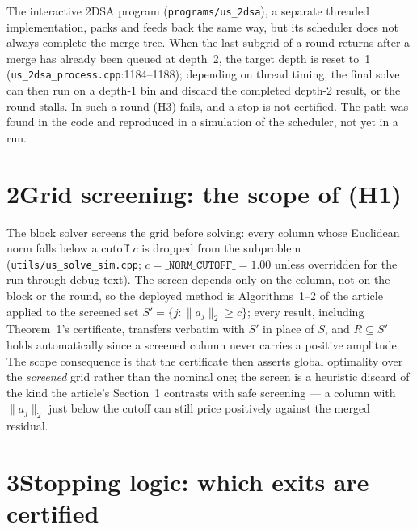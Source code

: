 \documentclass[pdflatex,sn-mathphys-num]{sn-jnl}
\begin{document}
The interactive 2DSA program (\texttt{programs/us\_2dsa}), a separate
threaded implementation, packs and feeds back the same way, but its
scheduler does not always complete the merge tree. When the last
subgrid of a round returns after a merge has already been queued at
depth~2, the target depth is reset to~1
(\texttt{us\_2dsa\_process.cpp}:1184--1188); depending on thread
timing, the final solve can then run on a depth-1 bin and discard the
completed depth-2 result, or the round stalls. In such a round (H3)
fails, and a stop is not certified. The path was found in the code
and reproduced in a simulation of the scheduler, not yet in a run.

\section*{2\quad Grid screening: the scope of (H1)}

The block solver screens the grid before solving: every column whose
Euclidean norm falls below a cutoff $c$ is dropped from the
subproblem (\texttt{utils/us\_solve\_sim.cpp};
$c=\texttt{\_NORM\_CUTOFF\_}=1.00$ unless overridden for the run
through debug text). The screen depends only on the
column, not on the block or the round, so the deployed method is
Algorithms~1--2 of the article applied to the screened set
$S'=\{j:\lVert a_j\rVert_2\ge c\}$; every result, including
Theorem~1's certificate, transfers verbatim with $S'$ in place of
$S$, and $R\subseteq S'$ holds automatically since a screened column
never carries a positive amplitude. The scope consequence is that the
certificate then asserts global optimality over the \emph{screened}
grid rather than the nominal one; the screen is a heuristic discard of
the kind the article's Section~1 contrasts with safe screening --- a
column with $\lVert a_j\rVert_2$ just below the cutoff can still price
positively against the merged residual.

\section*{3\quad Stopping logic: which exits are certified}
\end{document}
